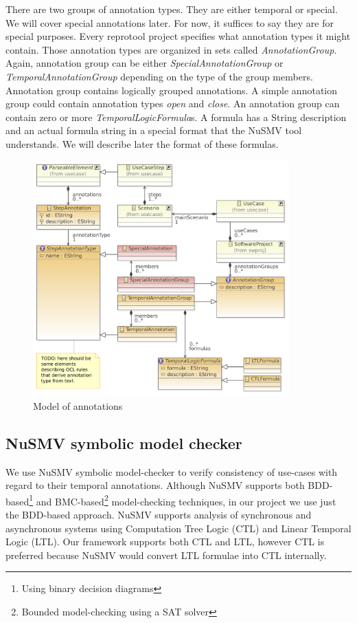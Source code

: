 There are two groups of annotation types. They are either temporal or special. We will cover special annotations later. For now, it
suffices to say they are for special purposes. Every reprotool project specifies what annotation types it might contain. Those
annotation types are organized in sets called \emph{AnnotationGroup}. Again, annotation group can be either \emph
{SpecialAnnotationGroup} or \emph{TemporalAnnotationGroup} depending on the type of the group members. Annotation group contains
logically grouped annotations. A simple annotation group could contain annotation types \emph{open} and \emph{close}.
An annotation group can contain zero or more \emph{TemporalLogicFormula}s. A formula has a String description and an actual formula
string in a special format that the NuSMV tool understands. We will describe later the format of these formulas.

\begin{figure}[ht]
  \centering
  \includegraphics[width=280pt]{images/ReprotoolUCAnnotModel}
  \caption{Model of annotations}
  \label{fig:ModelOfAnnotations}
\end{figure}

\subsection{NuSMV symbolic model checker}

We use NuSMV symbolic model-checker to verify consistency of use-cases with regard to their temporal annotations.
Although NuSMV supports both BDD-based\footnote{Using binary decision diagrams} and BMC-based\footnote{Bounded model-checking using a SAT solver} model-checking techniques, in our project we use just the BDD-based approach.
NuSMV supports analysis of synchronous and asynchronous systems using Computation Tree Logic (CTL) and Linear Temporal Logic (LTL).
Our framework supports both CTL and LTL, however CTL is preferred because NuSMV would convert LTL formulae into CTL internally.

